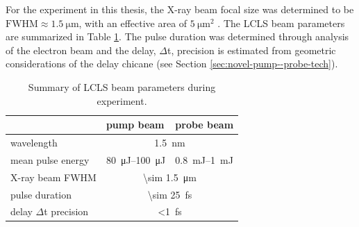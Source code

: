 %
%
%
%
For the experiment in this thesis, the X-ray beam focal size was determined to be $\text{FWHM}\approx \SI{1.5}{\micro\meter}$, with an effective area of $\SI{5}{\micro\meter\squared}$ \citep{Bucher-2016-Unpublished}. The LCLS beam parameters are summarized in Table \ref{tab:beam-params}. The pulse duration was determined through analysis of the electron beam and the delay, $\Delta$t, precision is estimated from geometric considerations of the delay chicane (see Section \ref{sec:novel-pump--probe-tech}).
\begin{table}
	\centering
		\begin{tabular}{ | l | l | l | }
		\hline
			 & pump beam & probe beam  \\ \hline
			wavelength & \multicolumn{2}{|c|}{\SI{1.5}{\nano\meter}} \\ \hline
			mean pulse energy & \SIrange{80}{100}{\micro\joule} & \SIrange{0.8}{1}{\milli\joule} \\ \hline
			X-ray beam FWHM & \multicolumn{2}{|c|}{\SI{\sim 1.5}{\micro\meter}} \\ \hline
			pulse duration & \multicolumn{2}{|c|}{\SI{\sim 25}{\femto\second}} \\ \hline
			delay $\Delta$t precision & \multicolumn{2}{|c|}{\SI{<1}{\femto\second}} \\ \hline
		\end{tabular}
	\caption{Summary of LCLS beam parameters during experiment.}
	\label{tab:beam-params}
\end{table}
%
%
%
